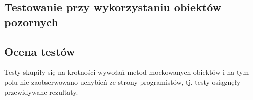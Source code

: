 \subsection{Testowanie przy wykorzystaniu obiektów pozornych}

\subsection{Ocena testów}

Testy skupiły się na krotności wywołań metod mockowanych obiektów i 
na tym polu nie zaobserwowano uchybień ze strony programistów, tj. 
testy osiągnęły przewidywane rezultaty.


